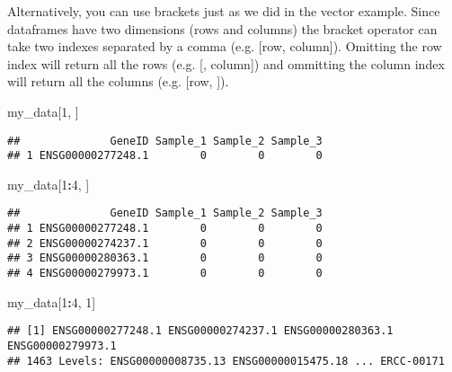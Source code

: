 \documentclass[]{article}
\newenvironment{Shaded}{\begin{snugshade}}{\end{snugshade}}
\newcommand{\DecValTok}[1]{\textcolor[rgb]{0.00,0.00,0.81}{#1}}
\newcommand{\OperatorTok}[1]{\textcolor[rgb]{0.81,0.36,0.00}{\textbf{#1}}}
\newcommand{\NormalTok}[1]{#1}
\begin{document}
\begin{Shaded}
\end{Shaded}

Alternatively, you can use brackets just as we did in the vector
example. Since dataframes have two dimensions (rows and columns) the
bracket operator can take two indexes separated by a comma (e.g. {[}row,
column{]}). Omitting the row index will return all the rows (e.g. {[},
column{]}) and ommitting the column index will return all the columns
(e.g. {[}row, {]}).

\begin{Shaded}
\begin{Highlighting}[]
\NormalTok{my_data[}\DecValTok{1}\NormalTok{, ]}
\end{Highlighting}
\end{Shaded}

\begin{verbatim}
##              GeneID Sample_1 Sample_2 Sample_3
## 1 ENSG00000277248.1        0        0        0
\end{verbatim}

\begin{Shaded}
\begin{Highlighting}[]
\NormalTok{my_data[}\DecValTok{1}\OperatorTok{:}\DecValTok{4}\NormalTok{, ]}
\end{Highlighting}
\end{Shaded}

\begin{verbatim}
##              GeneID Sample_1 Sample_2 Sample_3
## 1 ENSG00000277248.1        0        0        0
## 2 ENSG00000274237.1        0        0        0
## 3 ENSG00000280363.1        0        0        0
## 4 ENSG00000279973.1        0        0        0
\end{verbatim}

\begin{Shaded}
\begin{Highlighting}[]
\NormalTok{my_data[}\DecValTok{1}\OperatorTok{:}\DecValTok{4}\NormalTok{, }\DecValTok{1}\NormalTok{]}
\end{Highlighting}
\end{Shaded}

\begin{verbatim}
## [1] ENSG00000277248.1 ENSG00000274237.1 ENSG00000280363.1 ENSG00000279973.1
## 1463 Levels: ENSG00000008735.13 ENSG00000015475.18 ... ERCC-00171
\end{verbatim}
\end{document}
